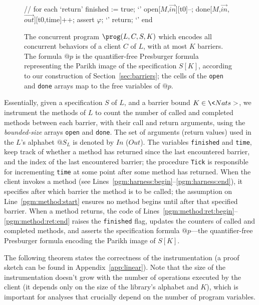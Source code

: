 \begin{figure}[t]
\begin{minipage}[t]{42mm}
\begin{program}
  // for each `return'
  finished := true; `\label{pgm:method:ret:begin}'
  open[$M$,$\vec{in}$][t0]--;
  done[$M$,$\vec{in}$,$\vec{out}$][t0,time]++;
  assert $\varphi$; `\label{pgm:method:assert}'
  return; `\label{pgm:method:ret:end}'
end
    \end{program}
  \end{minipage}
  \caption{The concurrent program $\prog(L,C,S,K)$ which encodes all concurrent 
		behaviors of a client $C$ of $L$, with at most $K$
		barriers. %
		The 
		formula $@p$ is the quantifier-free Presburger formula representing the Parikh image 
		of the specification $S[K]$, according to our construction of 
		Section~\ref{sec:barriers}; the cells of the \texttt{open} and 
		\texttt{done} arrays map to the free variables of $@p$.
	}
  \label{fig:program}
\vspace{-5mm}
\end{figure}


Essentially, given a specification $S$
of $L$, and a barrier bound $K \in \<Nats>$, we instrument the
methods of $L$ to count the number of called and
completed methods between each barrier, with their call and return arguments,
\resp using the \emph{bounded-size} arrays \texttt{open} and \texttt{done}. The set of arguments (\resp return values) used
in the $L$'s alphabet $@S_L$ is denoted by $In$ (\resp $Out$). 
The variables
\texttt{finished} and \texttt{time}, \resp keep track of whether a method has
returned since the last encountered barrier, and the index of the last
encountered barrier; the procedure \texttt{Tick} is responsible for
incrementing \texttt{time} at some point after some method has returned. 
When the client invokes a method (see Lines~\ref{pgm:harness:begin}--\ref{pgm:harness:end}),
it specifies after which barrier the method is to be called; the assumption on
Line~\ref{pgm:method:start} ensures no method begins until after that
specified barrier. When a method returns, the code of
Lines~\ref{pgm:method:ret:begin}--\ref{pgm:method:ret:end} raises the
\texttt{finished} flag, updates the counters of called and completed methods, and
asserts the specification formula $@p$---\ie the quantifier-free Presburger formula encoding
the Parikh image of $S[K]$. 

The following theorem states the correctness of the instrumentation (a proof sketch can be found in Appendix~\ref{app:linear}). Note that the size of the instrumentation doesn't grow with the number of operations executed by the client (it depends only on the size of the library's alphabet and $K$), which is important for analyses that crucially depend on the number of program variables.


